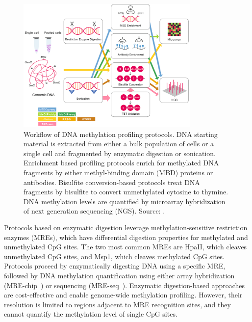 \begin{figure}[htbp!]
\centering
\includegraphics[width=0.8\textwidth]{seq}
\caption[Workflow of DNA methylation profiling protocols.]{Workflow of DNA methylation profiling protocols. DNA starting material is extracted from either a bulk population of cells or a single cell and fragmented by enzymatic digestion or sonication. Enrichment based profiling protocols enrich for methylated DNA fragments by either methyl-binding domain (MBD) proteins or antibodies. Bisulfite conversion-based protocols treat DNA fragments by bisulfite to convert unmethylated cytosine to thymine. DNA methylation levels are quantified by microarray hybridization of next generation sequencing (NGS). Source: \citet{yong_profiling_2016}.}
\label{fig:intro_seq}
\end{figure}

Protocols based on enzymatic digestion leverage methylation-sensitive restriction enzymes (MREs), which have differential digestion properties for methylated and unmethylated CpG sites. The two most common MREs are HpaII, which cleaves unmethylated CpG sites, and Msp1, which cleaves methylated CpG sites. Protocols proceed by enzymatically digesting DNA using a specific MRE, followed by DNA methylation quantification using either array hybridization (MRE-chip~\citep{chittur_help_2010}) or sequencing (MRE-seq~\citep{maunakea_conserved_2010}). Enzymatic digestion-based approaches are cost-effective and enable genome-wide methylation profiling. However, their resolution is limited to regions adjacent to MRE recognition sites, and they cannot quantify the methylation level of single CpG sites.

